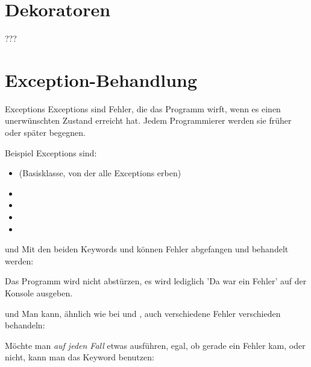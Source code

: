 \section{Dekoratoren}
\begin{frame}{???}
	
\end{frame}

\section{Exception-Behandlung}
\begin{frame}{Exceptions}
	\alert{Exceptions} sind Fehler, die das Programm wirft, wenn es einen unerwünschten Zustand erreicht hat. Jedem Programmierer werden sie früher oder später begegnen.
	
	Beispiel Exceptions sind:
	\begin{itemize}
		\item {}(Basisklasse, von der alle Exceptions erben)
		\item {}
		\item {}
		\item {}
		\item {}
	\end{itemize}
\end{frame}

\begin{frame}{ und }
	Mit den beiden Keywords  und  können Fehler abgefangen und behandelt werden:
	
	Das Programm wird nicht abstürzen, es wird lediglich 'Da war ein Fehler' auf der Konsole ausgeben.
\end{frame}

\begin{frame}{ und }
	Man kann, ähnlich wie bei  und , auch verschiedene Fehler verschieden behandeln:
	
\end{frame}

\begin{frame}{}
	Möchte man \textit{auf jeden Fall} etwas ausführen, egal, ob gerade ein Fehler kam, oder nicht, kann man das Keyword  benutzen:
	
\end{frame}

